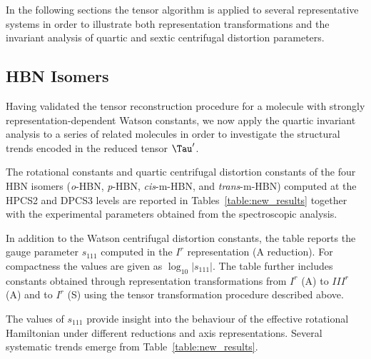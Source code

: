 In the following sections the tensor algorithm is applied to several
representative systems in order to illustrate both representation
transformations and the invariant analysis of quartic and sextic centrifugal
distortion parameters.

\subsection{HBN Isomers}

Having validated the tensor reconstruction procedure for a molecule with
strongly representation-dependent Watson constants, we now apply the quartic
invariant analysis to a series of related molecules in order to investigate
the structural trends encoded in the reduced tensor $\Tau'$.

The rotational constants and quartic centrifugal distortion constants of the
four HBN isomers (\emph{o}-HBN, \emph{p}-HBN, \emph{cis}-m-HBN, and
\emph{trans}-m-HBN) computed at the HPCS2 and DPCS3 levels are reported in
Tables~\ref{table:new_results} together with the experimental parameters
obtained from the spectroscopic analysis.

In addition to the Watson centrifugal distortion constants, the table reports
the gauge parameter $s_{111}$ computed in the $I^r$ representation
(A reduction). For compactness the values are given as
$\log_{10}|s_{111}|$. The table further includes constants obtained through
representation transformations from $I^r$ (A) to $III^r$ (A) and to $I^r$
(S) using the tensor transformation procedure described above.

The values of $s_{111}$ provide insight into the behaviour of the effective
rotational Hamiltonian under different reductions and axis representations.
Several systematic trends emerge from Table~\ref{table:new_results}.


